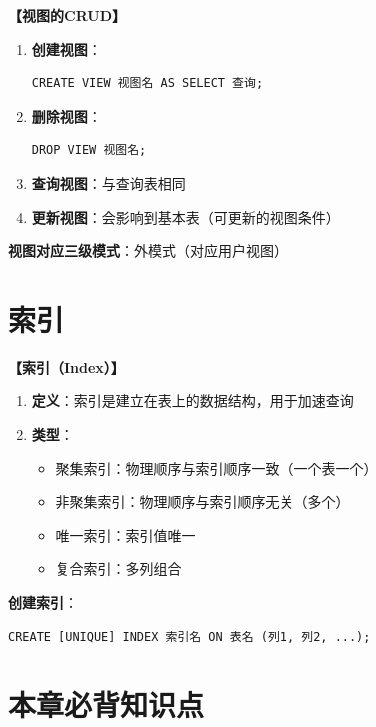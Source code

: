 \documentclass[12pt, a4paper]{article}
\newenvironment{bluebox}[1]{%
  \begin{trivlist}
  \item[\hskip\labelsep \textbf{#1}]
  \setlength{\parskip}{0.5ex}
  \setlength{\itemsep}{0.5ex}
}{%
  \end{trivlist}
}
\begin{document}
\begin{bluebox}{视图操作}
	\textbf{【视图的CRUD】}

	\begin{enumerate}[leftmargin=*, label=\textbf{\arabic*.}]
		\item \textbf{创建视图}：
		      \begin{verbatim}
CREATE VIEW 视图名 AS SELECT 查询;
		      \end{verbatim}
		\item \textbf{删除视图}：
		      \begin{verbatim}
DROP VIEW 视图名;
		      \end{verbatim}
		\item \textbf{查询视图}：与查询表相同
		\item \textbf{更新视图}：会影响到基本表（可更新的视图条件）
	\end{enumerate}

	\textbf{视图对应三级模式}：外模式（对应用户视图）
\end{bluebox}

\section{索引}

\begin{bluebox}{索引概念}
	\textbf{【索引（Index）】}

	\begin{enumerate}[leftmargin=*, label=\textbf{\arabic*.}]
		\item \textbf{定义}：索引是建立在表上的数据结构，用于加速查询
		\item \textbf{类型}：
		      \begin{itemize}
			      \item 聚集索引：物理顺序与索引顺序一致（一个表一个）
			      \item 非聚集索引：物理顺序与索引顺序无关（多个）
			      \item 唯一索引：索引值唯一
			      \item 复合索引：多列组合
		      \end{itemize}
	\end{enumerate}

	\textbf{创建索引}：
	\begin{verbatim}
CREATE [UNIQUE] INDEX 索引名 ON 表名 (列1, 列2, ...);
	\end{verbatim}
\end{bluebox}

\section{本章必背知识点}
\end{document}
